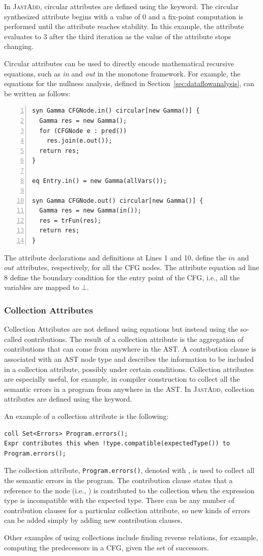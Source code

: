 In \textsc{JastAdd}, circular attributes are defined using the  keyword.
The circular synthesized attribute  begins with a value of 0 and
a fix-point computation is performed until the attribute reaches stability.
In this example, the attribute evaluates to 3 after the third iteration as
the value of the attribute stops changing.

Circular attributes can be used to directly encode mathematical recursive equations, 
such as \emph{in} and \emph{out} in the monotone framework. 
For example, the equations for the nullness analysis, defined in Section~\ref{sec:dataflowanalysis}, can be written as follows:
\begin{lstlisting}[language=JastAdd, numbers=left]
syn Gamma CFGNode.in() circular[new Gamma()] {
  Gamma res = new Gamma();
  for (CFGNode e : pred())
    res.join(e.out());
  return res;
}

eq Entry.in() = new Gamma(allVars());

syn Gamma CFGNode.out() circular[new Gamma()] {
  Gamma res = new Gamma(in());
  res = trFun(res);
  return res;
}
\end{lstlisting}
The attribute declarations and definitions at Lines 1 and 10, define the $in$ and
$out$ attributes, respectively, for all the CFG nodes.
The attribute equation ad line 8 define the boundary condition for the entry point 
of the CFG, i.e., all the variables are mapped to $\bot$.



    \subsubsection*{Collection Attributes} 
    Collection Attributes are not defined using equations but instead using the so-called contributions.
    The result of a collection attribute is the aggregation of contributions that can
    come from anywhere in the AST. A contribution clause is associated with
    an AST node type and describes the information to be included in a collection
    attribute, possibly under certain conditions. Collection attributes are especially
    useful, for example, in compiler construction to collect all the semantic errors in a program
    from anywhere in the AST. In \textsc{JastAdd}, collection attributes are defined using the
     keyword.

    An example of a collection attribute is the following:
    \begin{lstlisting}[language=JastAdd]
coll Set<Errors> Program.errors();
Expr contributes this when !type.compatible(expectedType()) to Program.errors();
    \end{lstlisting}
    The collection attribute, \texttt{Program.errors()}, denoted with ,
    is used to collect all the semantic errors in the program. The contribution clause
    states that a reference to the  node (i.e., ) is contributed to the collection when
    the expression type is incompatible with the expected type.
    There can be any number of contribution clauses for a particular collection attribute, so 
    new kinds of errors can be added simply by adding new contribution clauses.
    
    Other examples of using collections include finding reverse relations, for example, 
    computing the predecessors in a CFG, given the set of successors.



